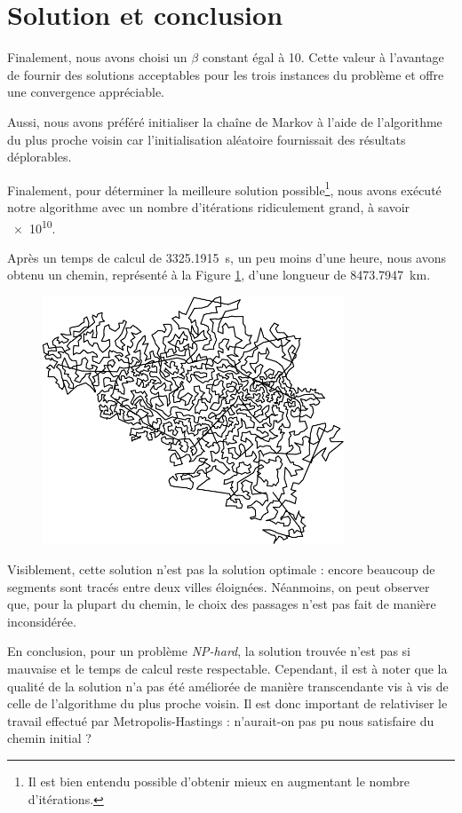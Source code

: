 \documentclass[a4paper, 12pt]{report}
\begin{document}
    \section{Solution et conclusion}
    Finalement, nous avons choisi un $\beta$ constant égal à \num{10}. Cette valeur à l'avantage de fournir des solutions acceptables pour les trois instances du problème et offre une convergence appréciable. \par
    Aussi, nous avons préféré initialiser la chaîne de Markov à l'aide de l'algorithme du plus proche voisin car l'initialisation aléatoire fournissait des résultats déplorables. \par
    Finalement, pour déterminer la meilleure solution possible\footnote{Il est bien entendu possible d'obtenir mieux en augmentant le nombre d'itérations.}, nous avons exécuté notre algorithme avec un nombre d'itérations ridiculement grand, à savoir \num{e10}. \par
    Après un temps de calcul de \SI{3325.1915}{\second}, \cad{} un peu moins d'une heure, nous avons obtenu un chemin, représenté à la Figure \ref{fig:final_solution}, d'une longueur de \SI{8473.7947}{\kilo\meter}.
    \begin{figure}[H]
        \centering
        \includegraphics[width=0.8\textwidth]{resources/pdf/final.pdf}
        \label{fig:final_solution}
    \end{figure}
    Visiblement, cette solution n'est pas la solution optimale : encore beaucoup de segments sont tracés entre deux villes éloignées. Néanmoins, on peut observer que, pour la plupart du chemin, le choix des passages n'est pas fait de manière inconsidérée. \par
    En conclusion, pour un problème \emph{NP-hard}, la solution trouvée n'est pas si mauvaise et le temps de calcul reste respectable. Cependant, il est à noter que la qualité de la solution n'a pas été améliorée de manière transcendante vis à vis de celle de l'algorithme du plus proche voisin. Il est donc important de relativiser le travail effectué par Metropolis-Hastings : n'aurait-on pas pu nous satisfaire du chemin initial ?
	\newpage
	\printbibliography
\end{document}
